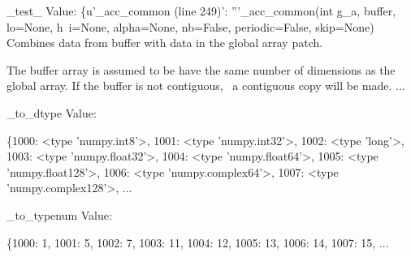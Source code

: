 \documentclass[12pt]{article}
\begin{document}
\begin{codeseg}
  _test_
    Value:
    \{u'_acc_common (line 249)': '''_acc_common(int g_a, buffer, lo=None, h\
    i=None, alpha=None, nb=False, periodic=False, skip=None)
    Combines data from buffer with data in the global array patch.
    
       The buffer array is assumed to be have the same number of
       dimensions as the global array.  If the buffer is not contiguous, \ a
       contiguous copy will be made.
       ...

_to_dtype
    Value:

    \{1000: <type 'numpy.int8'>,
     1001: <type 'numpy.int32'>,
     1002: <type 'long'>,
     1003: <type 'numpy.float32'>,
     1004: <type 'numpy.float64'>,
     1005: <type 'numpy.float128'>,
     1006: <type 'numpy.complex64'>,
     1007: <type 'numpy.complex128'>,
    ...

_to_typenum
    Value:

    \{1000: 1,
     1001: 5,
     1002: 7,
     1003: 11,
     1004: 12,
     1005: 13,
     1006: 14,
     1007: 15,
    ...
\end{codeseg}
\end{document}
